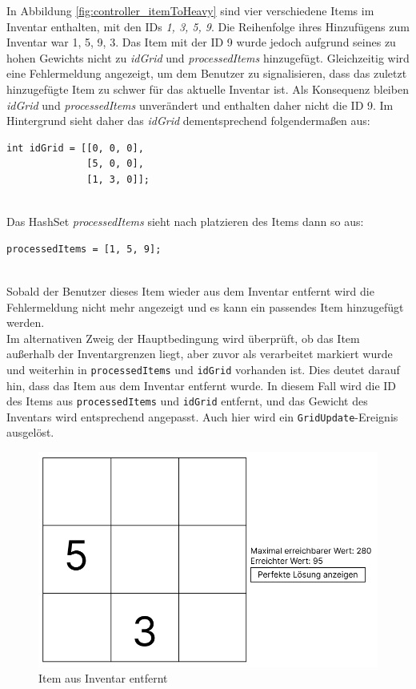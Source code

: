 In Abbildung \ref{fig:controller_itemToHeavy} sind vier verschiedene Items im Inventar enthalten, mit den IDs
\textit{1, 3, 5, 9}. Die Reihenfolge ihres Hinzufügens zum Inventar war 1, 5, 9, 3. Das Item mit der ID 9 wurde jedoch
aufgrund seines zu hohen Gewichts nicht zu \textit{idGrid} und \textit{processedItems} hinzugefügt. Gleichzeitig wird
eine Fehlermeldung angezeigt, um dem Benutzer zu signalisieren, dass das zuletzt hinzugefügte Item zu schwer für das
aktuelle Inventar ist. Als Konsequenz bleiben \textit{idGrid} und \textit{processedItems} unverändert und enthalten
daher nicht die ID 9. Im Hintergrund sieht daher das \textit{idGrid} dementsprechend folgendermaßen aus:
\begin{lstlisting}[style=csharp, caption={Item zu schwer für das Inventar}, label=code:controller_savedIDs]
int idGrid = [[0, 0, 0],
              [5, 0, 0],
              [1, 3, 0]];
\end{lstlisting}\\
Das HashSet \textit{processedItems} sieht nach platzieren des Items dann so aus:
\begin{lstlisting}[style=csharp, caption={ID verspeichert}, label=code:controller_savedID]
processedItems = [1, 5, 9];
\end{lstlisting}\\
Sobald der Benutzer dieses Item wieder aus dem Inventar entfernt wird die Fehlermeldung nicht mehr angezeigt und es kann
ein passendes Item hinzugefügt werden.\\

Im alternativen Zweig der Hauptbedingung wird überprüft, ob das Item außerhalb der Inventargrenzen liegt, aber zuvor
als verarbeitet markiert wurde und weiterhin in \texttt{processedItems} und \texttt{idGrid} vorhanden ist. Dies deutet
darauf hin, dass das Item aus dem Inventar entfernt wurde. In diesem Fall wird die ID des Items aus \texttt{processedItems}
und \texttt{idGrid} entfernt, und das Gewicht des Inventars wird entsprechend angepasst. Auch hier wird ein
\texttt{GridUpdate}-Ereignis ausgelöst.\\

\begin{figure}[h]
    \centering
    \includegraphics[scale=0.6]{images/itemEntfernt}
    \caption{Item aus Inventar entfernt}
    \label{fig:controller_itemEntfernt}
\end{figure}

